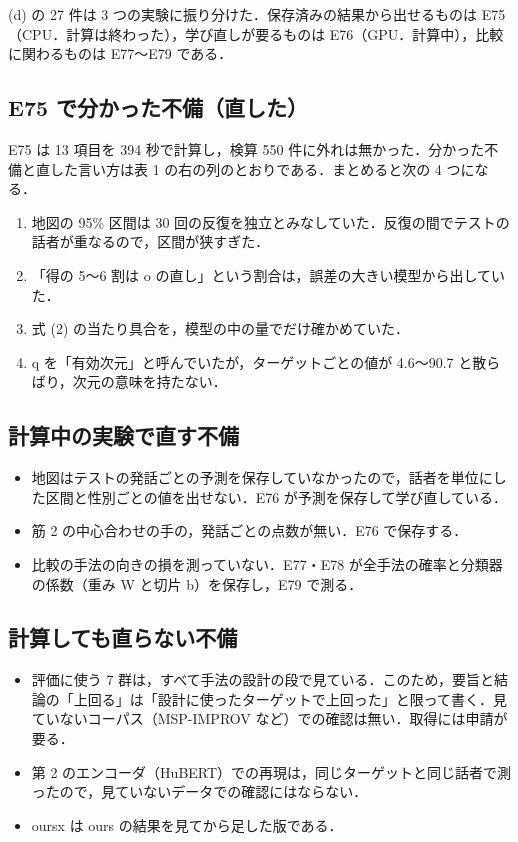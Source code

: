 \documentclass[a4paper,11pt]{ltjsarticle}
\begin{document}
(d) の 27 件は 3 つの実験に振り分けた．保存済みの結果から出せるものは E75（CPU．計算は終わった），学び直しが要るものは E76（GPU．計算中），比較に関わるものは E77〜E79 である．

\subsection{E75 で分かった不備（直した）}

E75 は 13 項目を 394 秒で計算し，検算 550 件に外れは無かった．分かった不備と直した言い方は表 1 の右の列のとおりである．まとめると次の 4 つになる．

\begin{enumerate}
\item 地図の 95\% 区間は 30 回の反復を独立とみなしていた．反復の間でテストの話者が重なるので，区間が狭すぎた．
\item 「得の 5〜6 割は o の直し」という割合は，誤差の大きい模型から出していた．
\item 式 (2) の当たり具合を，模型の中の量でだけ確かめていた．
\item q を「有効次元」と呼んでいたが，ターゲットごとの値が 4.6〜90.7 と散らばり，次元の意味を持たない．
\end{enumerate}

\subsection{計算中の実験で直す不備}

\begin{itemize}
\item 地図はテストの発話ごとの予測を保存していなかったので，話者を単位にした区間と性別ごとの値を出せない．E76 が予測を保存して学び直している．
\item 筋 2 の中心合わせの手の，発話ごとの点数が無い．E76 で保存する．
\item 比較の手法の向きの損を測っていない．E77・E78 が全手法の確率と分類器の係数（重み W と切片 b）を保存し，E79 で測る．
\end{itemize}

\subsection{計算しても直らない不備}

\begin{itemize}
\item 評価に使う 7 群は，すべて手法の設計の段で見ている．このため，要旨と結論の「上回る」は「設計に使ったターゲットで上回った」と限って書く．見ていないコーパス（MSP-IMPROV など）での確認は無い．取得には申請が要る．
\item 第 2 のエンコーダ（HuBERT）での再現は，同じターゲットと同じ話者で測ったので，見ていないデータでの確認にはならない．
\item oursx は ours の結果を見てから足した版である．
\end{itemize}
\end{document}
